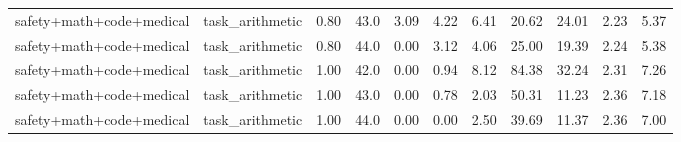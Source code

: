 \begin{table}[H]
{\begin{tabular}{llllrrrrrrr}
safety+math+code+medical & task\_arithmetic & 0.80 & 43.0 & 3.09 & 4.22 & 6.41 & 20.62 & 24.01 & 2.23 & 5.37 \\
safety+math+code+medical & task\_arithmetic & 0.80 & 44.0 & 0.00 & 3.12 & 4.06 & 25.00 & 19.39 & 2.24 & 5.38 \\
safety+math+code+medical & task\_arithmetic & 1.00 & 42.0 & 0.00 & 0.94 & 8.12 & 84.38 & 32.24 & 2.31 & 7.26 \\
safety+math+code+medical & task\_arithmetic & 1.00 & 43.0 & 0.00 & 0.78 & 2.03 & 50.31 & 11.23 & 2.36 & 7.18 \\
safety+math+code+medical & task\_arithmetic & 1.00 & 44.0 & 0.00 & 0.00 & 2.50 & 39.69 & 11.37 & 2.36 & 7.00 \\
\bottomrule
\end{tabular}
}
\end{table}